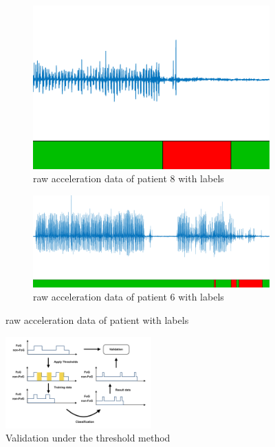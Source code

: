 \documentclass[article]{article}
\begin{document}
\begin{figure}
	\begin{subfigure}[b]{0.43\textwidth}
	\includegraphics[width=\textwidth]{patient8_ori_lda_label}
	\caption{raw acceleration data of patient 8 with labels}
	\label{fig:thresholding1}
	\end{subfigure}

	\begin{subfigure}[b]{0.43\textwidth}
		\includegraphics[width=\textwidth]{p6_lda_ori}
		\caption{raw acceleration data of patient 6 with labels}
		\label{fig:thresholding2}
	\end{subfigure}
	\caption{raw acceleration data of patient with labels}
\end{figure}

\begin{center}
	\begin{figure}
		\includegraphics[width=0.5\textwidth]{VALIDATION}
		\caption{Validation under the threshold method}
		\label{fig:validation}
\end{figure}
\end{center}
\end{document}
